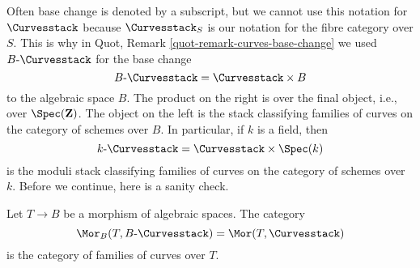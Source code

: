 \medskip\noindent
Often base change is denoted by a subscript, but we cannot use
this notation for $\Curvesstack$ because $\Curvesstack_S$
is our notation for the fibre category over $S$.
This is why in Quot, Remark \ref{quot-remark-curves-base-change}
we used $B\text{-}\Curvesstack$ for the base change
$$
B\text{-}\Curvesstack = \Curvesstack \times B
$$
to the algebraic space $B$. The product on the right is over the
final object, i.e., over $\Spec(\mathbf{Z})$. The object on the left
is the stack classifying families of curves on the category of schemes
over $B$. In particular, if $k$ is a field, then
$$
k\text{-}\Curvesstack = \Curvesstack \times \Spec(k)
$$
is the moduli stack classifying families of curves on the category
of schemes over $k$.
Before we continue, here is a sanity check.

\begin{lemma}
\label{lemma-extend-curves-to-spaces}
Let $T \to B$ be a morphism of algebraic spaces. The category
$$
\Mor_B(T, B\text{-}\Curvesstack) = \Mor(T, \Curvesstack)
$$
is the category of families of curves over $T$.
\end{lemma}

